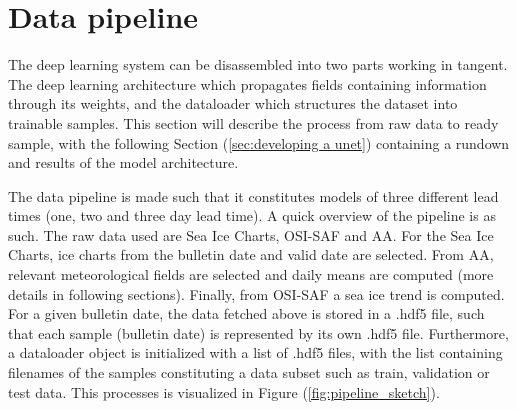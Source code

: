 \documentclass[../main/thesis.tex]{subfiles}
\begin{document}

\section{Data pipeline}
The deep learning system can be disassembled into two parts working in tangent. The deep learning architecture which propagates fields containing information through its weights, and the dataloader which structures the dataset into trainable samples. This section will describe the process from raw data to ready sample, with the following Section (\ref{sec:developing a unet}) containing a rundown and results of the model architecture.

The data pipeline is made such that it constitutes models of three different lead times (one, two and three day lead time). A quick overview of the pipeline is as such. The raw data used are Sea Ice Charts, OSI-SAF and AA. For the Sea Ice Charts, ice charts from the bulletin date and valid date are selected. From AA, relevant meteorological fields are selected and daily means are computed (more details in following sections). Finally, from OSI-SAF a sea ice trend is computed. For a given bulletin date, the data fetched above is stored in a .hdf5 file, such that each sample (bulletin date) is represented by its own .hdf5 file. Furthermore, a dataloader object is initialized with a list of .hdf5 files, with the list containing filenames of the samples constituting a data subset such as train, validation or test data. This processes is visualized in Figure (\ref{fig:pipeline_sketch}).
\end{document}
